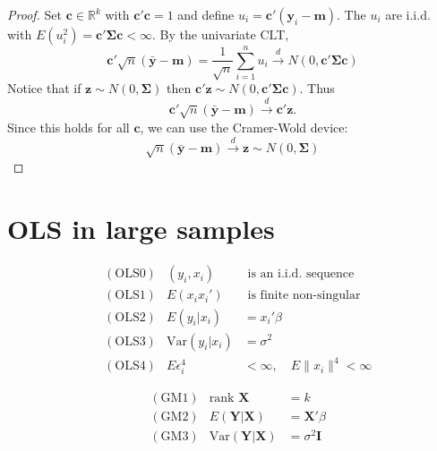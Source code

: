 \documentclass[DIV=14,titlepage=false]{scrreprt}
\begin{document}
\begin{proof}
    Set \( \mathbf{c}  \in  \mathbb{R}^k \) with \( \mathbf{c}'\mathbf{c} = 1 \) and define \( u_i = \mathbf{c}'(\mathbf{y}_i - \mathbf{m}) \). The \( u_i \) are i.i.d. with \( E(u_i^2) = \mathbf{c}'\mathbf{\Sigma} \mathbf{c} < \infty \). By the univariate CLT,
    \[
        \mathbf{c}' \sqrt{n}(\mathbf{\bar{y}} - \mathbf{m}) = \frac{1}{\sqrt{n}} \sum_{i=1}^n u_i \overset{d}{\to} N(0, \mathbf{c}'\mathbf{\Sigma} \mathbf{c})
    \]
    Notice that if \( \mathbf{z} \sim N(0, \mathbf{\Sigma}) \) then \( \mathbf{c}'\mathbf{z} \sim N(0, \mathbf{c}'\mathbf{\Sigma} \mathbf{c}) \). Thus
    \[
    \mathbf{c}'\sqrt{n}(\mathbf{\bar{y}} - \mathbf{m}) \overset{d}{\to} \mathbf{c}'\mathbf{z}.
    \]
    Since this holds for all \( \mathbf{c} \), we can use the Cramer-Wold device:
    \[
    \sqrt{n}(\mathbf{\bar{y}} - \mathbf{m}) \overset{d}{\to} \mathbf{z} \sim N(0, \mathbf{\Sigma})
    \]
    \end{proof}


\section{OLS in large samples}

\begin{minipage}{.5\textwidth}
    \begin{align*}
        &(\text{OLS0}) & (y_i, x_i) &\text{ is an i.i.d. sequence} \\
        &(\text{OLS1}) & E(x_i x_i') &\text{ is finite non-singular} \\
        &(\text{OLS2}) & E(y_i|x_i) &= x_i'\beta \\
        &(\text{OLS3}) & \text{Var}(y_i|x_i) &= \sigma^2 \\
        &(\text{OLS4}) & E\epsilon_i^4 &< \infty, \quad E\|x_i\|^4 < \infty
    \end{align*}
\end{minipage}%
\begin{minipage}{.5\textwidth}
    \begin{align*}
        &(\text{GM1}) & \text{rank } \mathbf{X} &= k \\
        &(\text{GM2}) & E(\mathbf{Y}|\mathbf{X}) &= \mathbf{X}'\beta \\
        &(\text{GM3}) & \text{Var} (\mathbf{Y}|\mathbf{X}) &= \sigma^2 \mathbf{I}
    \end{align*}
\end{minipage}\\
\end{document}
